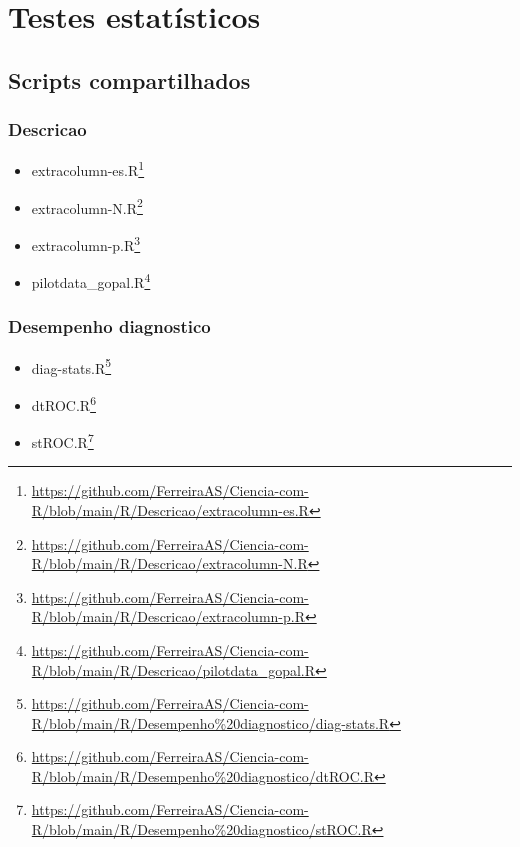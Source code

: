 \documentclass[
  a4paper,
]{book}
\renewcommand{\href}[2]{#2\footnote{\url{#1}}}
\begin{document}
\hypertarget{testes-estatisticos}{%
\chapter{\texorpdfstring{\textbf{Testes estatísticos}}{Testes estatísticos}}\label{testes-estatisticos}}

\hypertarget{scripts-compartilhados}{%
\section{Scripts compartilhados}\label{scripts-compartilhados}}

\hypertarget{descricao}{%
\subsection{Descricao}\label{descricao}}

\begin{itemize}
\item
  \href{https://github.com/FerreiraAS/Ciencia-com-R/blob/main/R/Descricao/extracolumn-es.R}{extracolumn-es.R}
\item
  \href{https://github.com/FerreiraAS/Ciencia-com-R/blob/main/R/Descricao/extracolumn-N.R}{extracolumn-N.R}
\item
  \href{https://github.com/FerreiraAS/Ciencia-com-R/blob/main/R/Descricao/extracolumn-p.R}{extracolumn-p.R}
\item
  \href{https://github.com/FerreiraAS/Ciencia-com-R/blob/main/R/Descricao/pilotdata_gopal.R}{pilotdata\_gopal.R}
\end{itemize}

\hypertarget{desempenho-diagnostico}{%
\subsection{Desempenho diagnostico}\label{desempenho-diagnostico}}

\begin{itemize}
\item
  \href{https://github.com/FerreiraAS/Ciencia-com-R/blob/main/R/Desempenho\%20diagnostico/diag-stats.R}{diag-stats.R}
\item
  \href{https://github.com/FerreiraAS/Ciencia-com-R/blob/main/R/Desempenho\%20diagnostico/dtROC.R}{dtROC.R}
\item
  \href{https://github.com/FerreiraAS/Ciencia-com-R/blob/main/R/Desempenho\%20diagnostico/stROC.R}{stROC.R}
\end{itemize}
\end{document}
